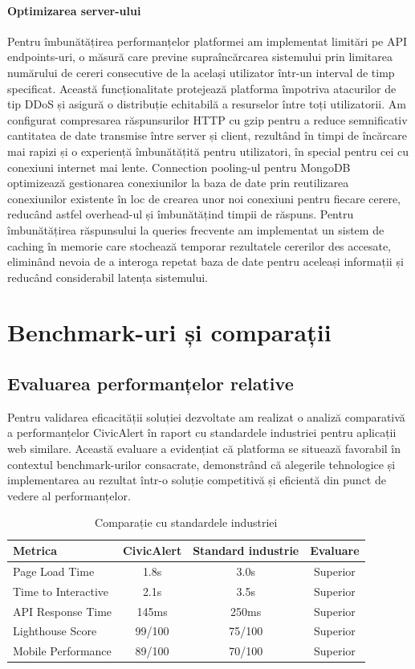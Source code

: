 \documentclass[12pt,a4paper]{report}
\begin{document}
\paragraph{Optimizarea server-ului}
Pentru îmbunătățirea performanțelor platformei am implementat limitări pe API endpoints-uri, o măsură care previne supraîncărcarea sistemului prin limitarea numărului de cereri consecutive de la același utilizator într-un interval de timp specificat. Această funcționalitate protejează platforma împotriva atacurilor de tip DDoS și asigură o distribuție echitabilă a resurselor între toți utilizatorii.
Am configurat compresarea răspunsurilor HTTP cu gzip pentru a reduce semnificativ cantitatea de date transmise între server și client, rezultând în timpi de încărcare mai rapizi și o experiență îmbunătățită pentru utilizatori, în special pentru cei cu conexiuni internet mai lente. Connection pooling-ul pentru MongoDB optimizează gestionarea conexiunilor la baza de date prin reutilizarea conexiunilor existente în loc de crearea unor noi conexiuni pentru fiecare cerere, reducând astfel overhead-ul și îmbunătățind timpii de răspuns.
Pentru îmbunătățirea răspunsului la queries frecvente am implementat un sistem de caching în memorie care stochează temporar rezultatele cererilor des accesate, eliminând nevoia de a interoga repetat baza de date pentru aceleași informații și reducând considerabil latența sistemului.

\section{Benchmark-uri și comparații}
\subsection{Evaluarea performanțelor relative}
Pentru validarea eficacității soluției dezvoltate am realizat o analiză comparativă a performanțelor CivicAlert în raport cu standardele industriei pentru aplicații web similare. Această evaluare a evidențiat că platforma se situează favorabil în contextul benchmark-urilor consacrate, demonstrând că alegerile tehnologice și implementarea au rezultat într-o soluție competitivă și eficientă din punct de vedere al performanțelor.

\begin{table}[H]
\centering
\caption{Comparație cu standardele industriei}
\label{tab:industry_benchmark}
\begin{tabular}{|l|c|c|c|}
\hline
\textbf{Metrica} & \textbf{CivicAlert} & \textbf{Standard industrie} & \textbf{Evaluare} \\
\hline
Page Load Time & 1.8s & 3.0s & Superior \\
\hline
Time to Interactive & 2.1s & 3.5s &  Superior \\
\hline
API Response Time & 145ms & 250ms &  Superior \\ 
\hline
Lighthouse Score & 99/100 & 75/100 &  Superior \\
\hline
Mobile Performance & 89/100 & 70/100 &  Superior \\
\hline
\end{tabular}
\end{table}
\end{document}
